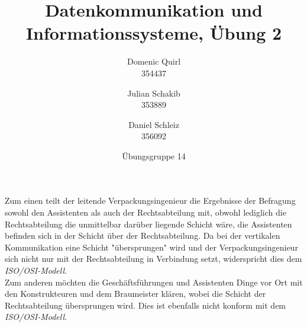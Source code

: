 \documentclass{../exercisesheet}
\title{Datenkommunikation und Informationssysteme, Übung 2}
\author{
    Domenic Quirl \\ 354437
    \and
    Julian Schakib \\ 353889
    \and 
    Daniel Schleiz \\ 356092
}
\date{Übungsgruppe 14}
\begin{document}
\maketitle
\pointtable

\begin{exercise}{1}
	Zum einen teilt der leitende Verpackungsingenieur die Ergebnisse der Befragung sowohl den Assistenten als auch der Rechtsabteilung mit, obwohl lediglich
	die Rechtsabteilung die unmittelbar darüber liegende Schicht wäre, die Assistenten befinden sich in der Schicht über der Rechtsabteilung. Da bei der vertikalen
	Kommunikation eine Schicht "übersprungen" wird und der Verpackungsingenieur sich nicht nur mit der Rechtsabteilung in Verbindung setzt, widerspricht dies
	dem \textit{ISO/OSI-Modell}. \\
	Zum anderen möchten die Geschäftsführungen und Assistenten Dinge vor Ort mit den Konstrukteuren und dem Braumeister klären, wobei die Schicht der	
	Rechtsabteilung übersprungen wird. Dies ist ebenfalls nicht konform mit dem \textit{ISO/OSI-Modell}. \\
\end{exercise}
\end{document}
